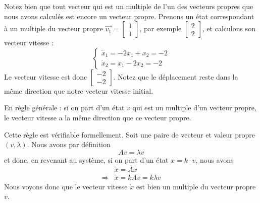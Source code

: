         Notez bien que tout vecteur qui est un multiple de l'un des vecteurs propres que nous avons calculés est encore un vecteur propre.
        Prenons un état correspondant à un multiple du vecteur propre $\overrightarrow{v_1} = \begin{bmatrix} 1 \\ 1 \end{bmatrix}$, par exemple $\begin{bmatrix}2\\ 2\end{bmatrix}$, et calculons son vecteur vitesse :
        \begin{equation}
            \begin{cases}
                \dot{x}_1 = -2x_1 + x_2 = -2 \\
                \dot{x}_2 = x_1 - 2x_2 = -2
            \end{cases}
        \end{equation}
        Le vecteur vitesse est donc $\begin{bmatrix}-2\\ -2\end{bmatrix}$. Notez que le déplacement reste dans la même direction que notre vecteur vitesse initial.

        En règle générale : si on part d'un état $v$ qui est un multiple d'un vecteur propre, le vecteur vitesse a la même direction que ce vecteur propre.
        
        Cette règle est vérifiable formellement. Soit une paire de vecteur et valeur propre $(v, \lambda)$. Nous avons par définition
        \begin{equation}
            A v = \lambda v
        \end{equation}
        et donc, en revenant au système, si on part d'un état $x = k \cdot v$, nous avons
        \begin{equation}
            \begin{split}
                &\dot{x} = A x \\
                \Rightarrow& \dot{x} = k A v = k \lambda v
            \end{split}
        \end{equation}
        Nous voyons donc que le vecteur vitesse $\dot{x}$ est bien un multiple du vecteur propre $v$.
